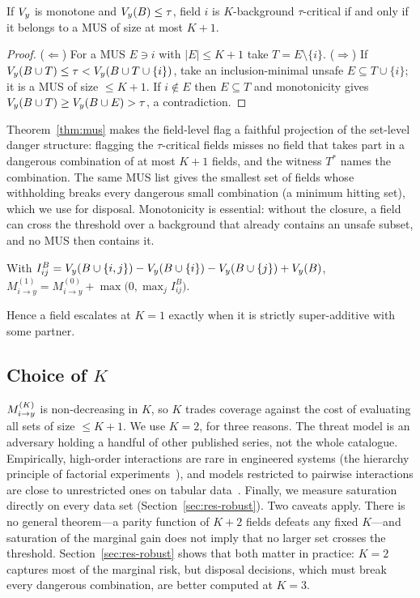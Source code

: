 \begin{theorem}\label{thm:mus}
If $V_{y}$ is monotone and $V_{y}(B)\le\tau$, field $i$ is $K$-background $\tau$-critical if and
only if it belongs to a MUS of size at most $K+1$.
\end{theorem}
\begin{proof}
($\Leftarrow$) For a MUS $E\ni i$ with $|E|\le K+1$ take $T=E\setminus\{i\}$.
($\Rightarrow$) If $V_{y}(B\cup T)\le\tau<V_{y}(B\cup T\cup\{i\})$, take an inclusion-minimal unsafe
$E\subseteq T\cup\{i\}$; it is a MUS of size $\le K+1$. If $i\notin E$ then $E\subseteq T$ and
monotonicity gives $V_{y}(B\cup T)\ge V_{y}(B\cup E)>\tau$, a contradiction.
\end{proof}
Theorem~\ref{thm:mus} makes the field-level flag a faithful projection of the set-level
danger structure: flagging the $\tau$-critical fields misses no field that takes part in a
dangerous combination of at most $K+1$ fields, and the witness $T^*$ names the combination.
The same MUS list gives the smallest set of fields whose withholding breaks every dangerous
small combination (a minimum hitting set), which we use for disposal.
Monotonicity is essential: without the closure, a field can cross the threshold over a
background that already contains an unsafe subset, and no MUS then contains it.

\begin{proposition}[Closed form at $K=1$]\label{prop:k1}
With $I^B_{ij}=V_{y}(B\cup\{i,j\})-V_{y}(B\cup\{i\})-V_{y}(B\cup\{j\})+V_{y}(B)$,
$M^{(1)}_{i\to y}=M^{(0)}_{i\to y}+\max\big(0,\max_{j} I^{B}_{ij}\big)$.
\end{proposition}
Hence a field escalates at $K=1$ exactly when it is strictly super-additive with some partner.

\subsection{Choice of $K$}
$M^{(K)}_{i \to y}$ is non-decreasing in $K$, so $K$ trades coverage against the cost of evaluating all sets
of size $\le K+1$. We use $K=2$, for three reasons. The threat model is an adversary holding a
handful of other published series, not the whole catalogue. Empirically, high-order
interactions are rare in engineered systems (the hierarchy principle of factorial
experiments~\cite{li2006regularities}), and models restricted to pairwise interactions are
close to unrestricted ones on tabular data~\cite{lou2013ga2m}. Finally, we measure saturation
directly on every data set (Section~\ref{sec:res-robust}). Two caveats apply. There is no general
theorem---a parity function of $K+2$ fields defeats any fixed $K$---and saturation of the marginal gain
does not imply that no larger set crosses the threshold. Section~\ref{sec:res-robust} shows that both
matter in practice: $K=2$ captures most of the marginal risk, but disposal decisions, which must break
every dangerous combination, are better computed at $K=3$.

